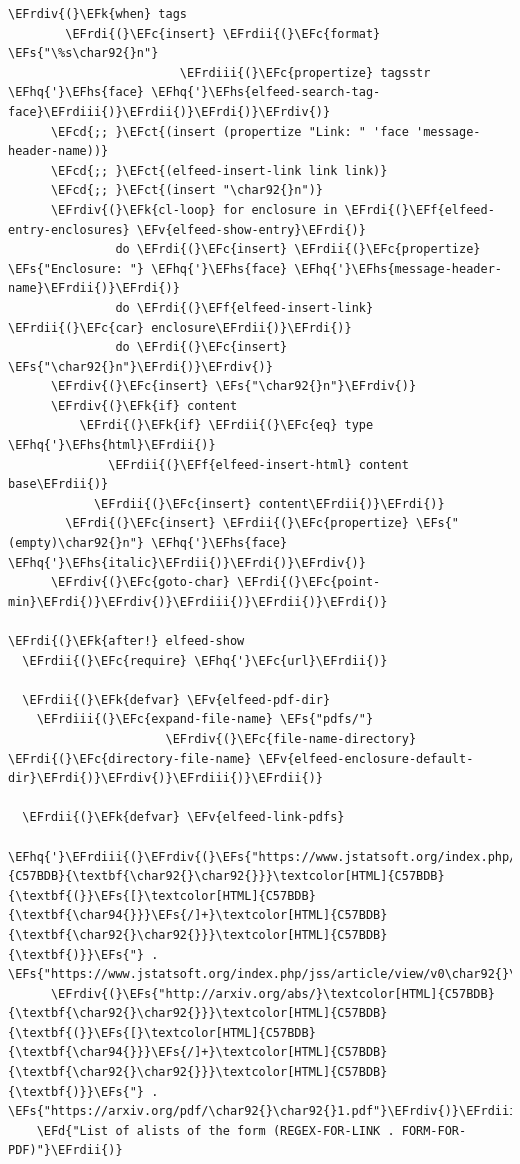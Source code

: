 \documentclass{scrartcl}
\newcommand{\EFk}[1]{\textcolor{EFk}{#1}} %
\newcommand{\EFd}[1]{\textcolor{EFd}{#1}} %
\newcommand{\EFs}[1]{\textcolor{EFs}{#1}} %
\newcommand{\EFct}[1]{\textcolor{EFct}{#1}} %
\newcommand{\EFc}[1]{\textcolor{EFc}{#1}} %
\newcommand{\EFv}[1]{\textcolor{EFv}{#1}} %
\newcommand{\EFf}[1]{\textcolor{EFf}{#1}} %
\newcommand{\EFcd}[1]{\textcolor{EFcd}{#1}} %
\newcommand{\EFhq}[1]{#1} %
\newcommand{\EFhs}[1]{#1} %
\newcommand{\EFrdi}[1]{#1} %
\newcommand{\EFrdii}[1]{#1} %
\newcommand{\EFrdiii}[1]{#1} %
\newcommand{\EFrdiv}[1]{#1} %
\begin{document}
\begin{Code}
\begin{Verbatim}[]
      \EFrdiv{(}\EFk{when} tags
        \EFrdi{(}\EFc{insert} \EFrdii{(}\EFc{format} \EFs{"\%s\char92{}n"}
                        \EFrdiii{(}\EFc{propertize} tagsstr \EFhq{'}\EFhs{face} \EFhq{'}\EFhs{elfeed-search-tag-face}\EFrdiii{)}\EFrdii{)}\EFrdi{)}\EFrdiv{)}
      \EFcd{;; }\EFct{(insert (propertize "Link: " 'face 'message-header-name))}
      \EFcd{;; }\EFct{(elfeed-insert-link link link)}
      \EFcd{;; }\EFct{(insert "\char92{}n")}
      \EFrdiv{(}\EFk{cl-loop} for enclosure in \EFrdi{(}\EFf{elfeed-entry-enclosures} \EFv{elfeed-show-entry}\EFrdi{)}
               do \EFrdi{(}\EFc{insert} \EFrdii{(}\EFc{propertize} \EFs{"Enclosure: "} \EFhq{'}\EFhs{face} \EFhq{'}\EFhs{message-header-name}\EFrdii{)}\EFrdi{)}
               do \EFrdi{(}\EFf{elfeed-insert-link} \EFrdii{(}\EFc{car} enclosure\EFrdii{)}\EFrdi{)}
               do \EFrdi{(}\EFc{insert} \EFs{"\char92{}n"}\EFrdi{)}\EFrdiv{)}
      \EFrdiv{(}\EFc{insert} \EFs{"\char92{}n"}\EFrdiv{)}
      \EFrdiv{(}\EFk{if} content
          \EFrdi{(}\EFk{if} \EFrdii{(}\EFc{eq} type \EFhq{'}\EFhs{html}\EFrdii{)}
              \EFrdii{(}\EFf{elfeed-insert-html} content base\EFrdii{)}
            \EFrdii{(}\EFc{insert} content\EFrdii{)}\EFrdi{)}
        \EFrdi{(}\EFc{insert} \EFrdii{(}\EFc{propertize} \EFs{"(empty)\char92{}n"} \EFhq{'}\EFhs{face} \EFhq{'}\EFhs{italic}\EFrdii{)}\EFrdi{)}\EFrdiv{)}
      \EFrdiv{(}\EFc{goto-char} \EFrdi{(}\EFc{point-min}\EFrdi{)}\EFrdiv{)}\EFrdiii{)}\EFrdii{)}\EFrdi{)}

\EFrdi{(}\EFk{after!} elfeed-show
  \EFrdii{(}\EFc{require} \EFhq{'}\EFc{url}\EFrdii{)}

  \EFrdii{(}\EFk{defvar} \EFv{elfeed-pdf-dir}
    \EFrdiii{(}\EFc{expand-file-name} \EFs{"pdfs/"}
                      \EFrdiv{(}\EFc{file-name-directory} \EFrdi{(}\EFc{directory-file-name} \EFv{elfeed-enclosure-default-dir}\EFrdi{)}\EFrdiv{)}\EFrdiii{)}\EFrdii{)}

  \EFrdii{(}\EFk{defvar} \EFv{elfeed-link-pdfs}
    \EFhq{'}\EFrdiii{(}\EFrdiv{(}\EFs{"https://www.jstatsoft.org/index.php/jss/article/view/v0}\textcolor[HTML]{C57BDB}{\textbf{\char92{}\char92{}}}\textcolor[HTML]{C57BDB}{\textbf{(}}\EFs{[}\textcolor[HTML]{C57BDB}{\textbf{\char94{}}}\EFs{/]+}\textcolor[HTML]{C57BDB}{\textbf{\char92{}\char92{}}}\textcolor[HTML]{C57BDB}{\textbf{)}}\EFs{"} . \EFs{"https://www.jstatsoft.org/index.php/jss/article/view/v0\char92{}\char92{}1/v\char92{}\char92{}1.pdf"}\EFrdiv{)}
      \EFrdiv{(}\EFs{"http://arxiv.org/abs/}\textcolor[HTML]{C57BDB}{\textbf{\char92{}\char92{}}}\textcolor[HTML]{C57BDB}{\textbf{(}}\EFs{[}\textcolor[HTML]{C57BDB}{\textbf{\char94{}}}\EFs{/]+}\textcolor[HTML]{C57BDB}{\textbf{\char92{}\char92{}}}\textcolor[HTML]{C57BDB}{\textbf{)}}\EFs{"} . \EFs{"https://arxiv.org/pdf/\char92{}\char92{}1.pdf"}\EFrdiv{)}\EFrdiii{)}
    \EFd{"List of alists of the form (REGEX-FOR-LINK . FORM-FOR-PDF)"}\EFrdii{)}


\end{Verbatim}
\end{Code}
\end{document}
